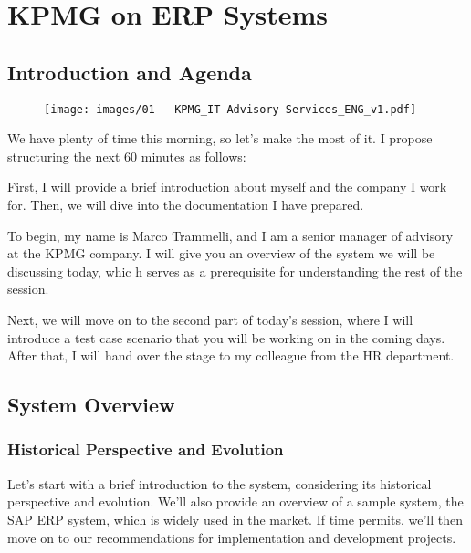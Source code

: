 \section{KPMG on ERP Systems}\label{technical-presentation}

\subsection{Introduction and Agenda}\label{introduction-and-agenda}

\begin{figure}[!h]
    \centering
    \texttt{[image: images/01 - KPMG\_IT Advisory Services\_ENG\_v1.pdf]}
\end{figure}

We have plenty of time this morning, so let's make the most of it. I
propose structuring the next 60 minutes as follows:

First, I will provide a brief introduction about myself and the company
I work for. Then, we will dive into the documentation I have prepared.

To begin, my name is Marco Trammelli, and I am a senior manager of advisory at the KPMG company. I will give you an overview of the system we
will be discussing today, whic  h serves as a prerequisite for
understanding the rest of the session.

Next, we will move on to the second part of today's session, where I
will introduce a test case scenario that you will be working on in the
coming days. After that, I will hand over the stage to my colleague from
the HR department.

\subsection{System Overview}\label{system-overview}

\subsubsection{Historical Perspective and
    Evolution}\label{historical-perspective-and-evolution}

Let's start with a brief introduction to the system, considering its
historical perspective and evolution. We'll also provide an overview of
a sample system, the SAP ERP system, which is widely used in the
market. If time permits, we'll then move on to our recommendations for
implementation and development projects.

